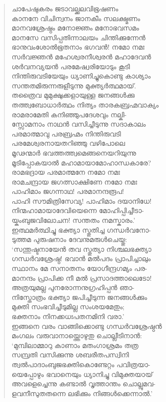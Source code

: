 \begin{verse}
ചാപേഷുകരം ജടാവല്ക്കലവിഭൂഷണം\\
കാനനേ വിചിന്വനം ജാനകീം സലക്ഷ്മണം\\
മാനവശ്രേഷ്ഠം മനോജ്ഞം മനോഭവസമം\\
മാനസേ വസിപ്പതിന്നാലയം ചിന്തിക്കുന്നേന്‍\\
ഭാനുവംശോല്‍ഭൂതനാം ഭഗവന്‍! നമോ നമഃ\\
സര്‍വജ്ഞന്‍ മഹേശ്വരനീശ്വരന്‍ മഹാദേവന്‍\\
ശര്‍വനവ്യയന്‍ പരമേഷ്വരിയോടും കൂടി\\
നിന്തിരുവടിയേയും ധ്യാണിച്ചുകൊണ്ടു കാശ്യാം\\
സന്തതമിരുന്നരുളീടുന്നു മുക്ത്യര്‍ത്ഥമായ്.\\
തത്രൈവ മുമുക്ഷുക്കളായുള്ള ജനങ്ങള്‍ക്കു\\
തത്ത്വബോധാര്‍ത്ഥം നിത്യം താരകബ്രഹ്മവാക്യം\\
രാമരാമേതി കനിഞ്ഞുപദേശവും നല്കി-\\
സ്സോമനാം നാഥന്‍ വസിച്ചീടുന്നു സദാകാലം\\
പരമാത്മാവു പരബ്രഹ്മം നിന്തിരുവടി\\
പരമേശ്വരനായതറിഞ്ഞു വഴിപോലെ\\
മൂഢന്മാര്‍ ഭവത്തത്ത്വമെങ്ങനെയറിയുന്നു\\
മൂടിപ്പോകയാല്‍ മഹാമായാമോഹാന്ധകാരേ?\\
രാമഭദ്രായ പരമാത്മനേ നമോ നമഃ\\
രാമചന്ദ്രായ ജഗത്സാക്ഷിണേ നമോ നമഃ\\
പാഹിമാം ജഗന്നാഥ! പരമാനന്ദരൂപ!\\
പാഹി സൗമിത്രിസേവ്യ! പാഹിമാം ദയാനിധേ!\\
നിന്മഹാമായാദേവിയെന്നെ മോഹിപ്പിച്ചീടാ-\\
യ്കംബുജവിലോചന! സന്തതം നമസ്കാരം.’\\
ഇത്ഥമര്‍ത്ഥിച്ചു ഭക്ത്യാ സ്തുതിച്ച ഗന്ധര്‍വനോ-\\
ടുത്തമ പുരുഷനാം ദേവനുമരുള്‍ചെയ്തു:\\
‘സന്തുഷ്ടനായേന്‍ തവ സ്തുത്യാ നിശ്ചലഭക്ത്യാ\\
ഗന്ധര്‍വശ്രേഷ്ഠ! ഭവാന്‍ മല്‍പദം പ്രാപിച്ചാലും\\
സ്ഥാനം മേ സനാതനം യോഗീന്ദ്രഗമ്യം പര-\\
മാനന്ദം പ്രാപിക്ക നീ മല്‍ പ്രസാദത്താലെടോ!\\
അത്രയുമല്ല പുനരോന്നനുഗ്രഹിപ്പന്‍ ഞാ-\\
നിസ്തോത്രം ഭക്ത്യാ ജപിച്ചീടുന്ന ജനങ്ങള്‍ക്കും\\
മുക്തി സംഭവിച്ചീടുമില്ല സംശയമേതും;\\
ഭക്തനാം നിനക്കധഃപതനമിനി വരാ.’\\
ഇങ്ങനെ വരം വാങ്ങിക്കൊണ്ടു ഗന്ധര്‍വശ്രേഷ്ഠന്‍\\
മംഗലം വരുവാനായ്ത്തൊഴുതു ചൊല്ലീടിനാന്‍:\\
‘മുമ്പിലാമ്മാറു കാണാം മതംഗാശ്രമം തത്ര\\
സമ്പ്രതി വസിക്കുന്നു ശബരീതപസ്വിനി\\
ത്വല്‍പാദാംബുജഭക്തികൊണ്ടേറ്റം പവിത്രയാ-\\
യെപ്പോഴും ഭവാനെയും ധ്യാനിച്ചു വിമുക്തയായ്\\
അവളെച്ചെന്നു കണ്ടാല്‍ വൃത്താന്തം ചൊല്ലുമവ-\\
ളവനീസുതതന്നെ ലഭിക്കും നിങ്ങള്‍ക്കെന്നാല്‍.’
\end{verse}

